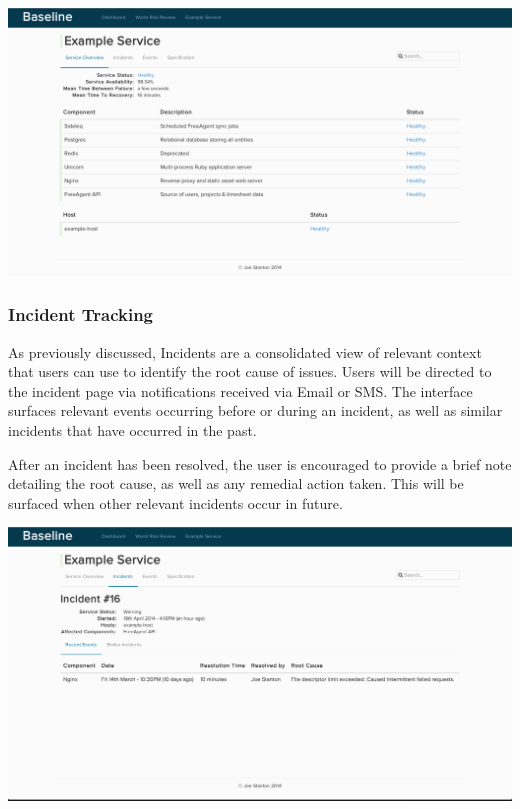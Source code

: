 \documentclass{cshonours}
\begin{document}
\begin{center}
  \includegraphics[scale=0.28]{web-ui/service-overview.png}
\end{center}

\subsubsection{Incident Tracking}

As previously discussed, Incidents are a consolidated view of relevant context that users can use to identify the root cause of issues. Users will be directed to the incident page via notifications received via Email or SMS\@. The interface surfaces relevant events occurring before or during an incident, as well as similar incidents that have occurred in the past.

After an incident has been resolved, the user is encouraged to provide a brief note detailing the root cause, as well as any remedial action taken. This will be surfaced when other relevant incidents occur in future.

\begin{center}
  \includegraphics[scale=0.28]{web-ui/incidents.png}
\end{center}
\end{document}

